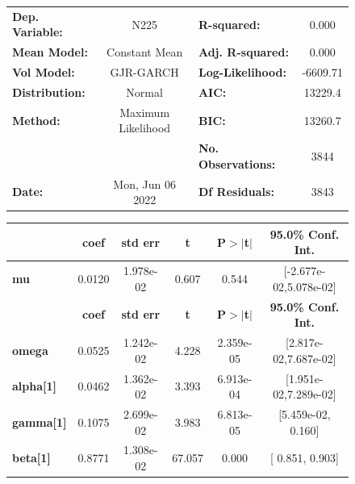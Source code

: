 \documentclass[a4paper, oneside]{discothesis}
\begin{document}
\begin{figure}
\begin{multicols}{2}
{  
\begin{center}
\begin{tabular}{lclc}
\toprule
\textbf{Dep. Variable:} &        N225        & \textbf{  R-squared:         } &     0.000   \\
\textbf{Mean Model:}    &   Constant Mean    & \textbf{  Adj. R-squared:    } &     0.000   \\
\textbf{Vol Model:}     &     GJR-GARCH      & \textbf{  Log-Likelihood:    } &   -6609.71  \\
\textbf{Distribution:}  &       Normal       & \textbf{  AIC:               } &    13229.4  \\
\textbf{Method:}        & Maximum Likelihood & \textbf{  BIC:               } &    13260.7  \\
\textbf{}               &                    & \textbf{  No. Observations:  } &    3844     \\
\textbf{Date:}          &  Mon, Jun 06 2022  & \textbf{  Df Residuals:      } &    3843     \\
\bottomrule
\end{tabular}
\begin{tabular}{lccccc}
            & \textbf{coef} & \textbf{std err} & \textbf{t} & \textbf{P$> |$t$|$} & \textbf{95.0\% Conf. Int.}  \\
\midrule
\textbf{mu} &       0.0120  &    1.978e-02     &     0.607  &          0.544       &   [-2.677e-02,5.078e-02]    \\
                  & \textbf{coef} & \textbf{std err} & \textbf{t} & \textbf{P$> |$t$|$} & \textbf{95.0\% Conf. Int.}  \\
\midrule
\textbf{omega}    &       0.0525  &    1.242e-02     &     4.228  &      2.359e-05       &   [2.817e-02,7.687e-02]     \\
\textbf{alpha[1]} &       0.0462  &    1.362e-02     &     3.393  &      6.913e-04       &   [1.951e-02,7.289e-02]     \\
\textbf{gamma[1]} &       0.1075  &    2.699e-02     &     3.983  &      6.813e-05       &    [5.459e-02,  0.160]      \\
\textbf{beta[1]}  &       0.8771  &    1.308e-02     &    67.057  &        0.000         &     [  0.851,  0.903]       \\
\bottomrule
\end{tabular}
\end{center}

}
\end{multicols}
\end{figure}
\end{document}
